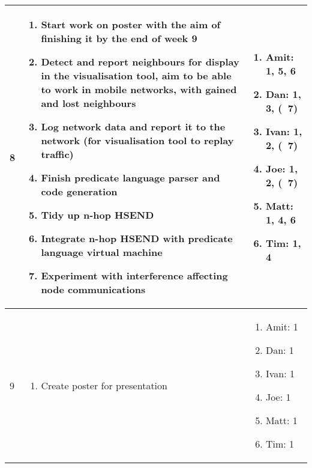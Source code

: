 \begin{center}
\begin{longtable}{| l | p{9cm} | p{3.5cm} |}
	8 & \begin{enumerate}
			\item Start work on poster with the aim of finishing it by the end of week 9
			\item Detect and report neighbours for display in the visualisation tool, aim to be able to work in mobile networks, with gained and lost neighbours
			\item Log network data and report it to the network (for visualisation tool to replay traffic)
			\item Finish predicate language parser and code generation
			\item Tidy up n-hop HSEND
			\item Integrate n-hop HSEND with predicate language virtual machine
			\item Experiment with interference affecting node communications
		\end{enumerate} &
	\begin{enumerate}
		\item[] Amit: 1, 5, 6
		\item[] Dan: 1, 3, (~7)
		\item[] Ivan: 1, 2, (~7)
		\item[] Joe: 1, 2, (~7)
		\item[] Matt: 1, 4, 6
		\item[] Tim: 1, 4
	\end{enumerate}
	\\ \hline

	9 & \begin{enumerate}
			\item Create poster for presentation
		\end{enumerate} &
	\begin{enumerate}
		\item[] Amit: 1
		\item[] Dan: 1
		\item[] Ivan: 1
		\item[] Joe: 1
		\item[] Matt: 1
		\item[] Tim: 1
	\end{enumerate}
	\\ \hline


\end{longtable}
\end{center}
